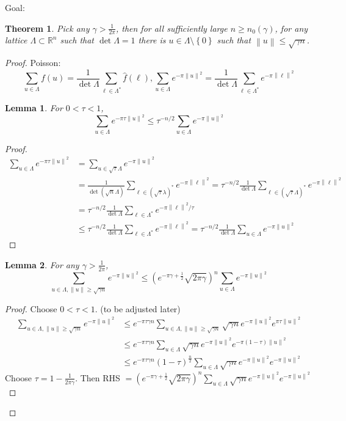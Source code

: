 \documentclass{report}
\newcommand{\R}{\mathbb{R}}
\newcommand{\norm}[1]{\left\| #1 \right\|}
\newcommand{\set}[1]{\left\{ #1 \right\}}
\newtheorem{theorem}{Theorem}[section]
\newtheorem{lemma}{Lemma}[section]
\theoremstyle{definition}
\theoremstyle{remark}
\numberwithin{equation}{section}
\begin{document}
Goal: 
\begin{theorem}
    Pick any $\gamma > \frac{1}{2\pi}$, then for all sufficiently large $n \geq n_0(\gamma)$, for any lattice $\Lambda \subset \R^n$ such that $\det \Lambda = 1$ there is $u \in \Lambda \setminus \set{0}$ such that $\norm{u} \leq \sqrt{\gamma n}$.
\end{theorem}
\begin{proof}
    Poisson:
    \[\sum_{u \in \Lambda} f(u) =\frac{1}{\det \Lambda} \sum_{\ell \in \Lambda^*} \widehat{f}(\ell), \sum_{u \in \Lambda} e^{-\pi\norm{u}^2} = \frac{1}{\det\Lambda}\sum_{\ell \in \Lambda^*} e^{-\pi\norm{\ell}^2}\]

    \begin{lemma}
        For $0 < \tau < 1$, \[\sum_{u \in \Lambda} e^{-\pi \tau \norm{u}^2} \leq \tau^{-n/2}\sum_{u \in \Lambda} e^{-\pi\norm{u}^2}\]
    \end{lemma}
    \begin{proof}
        \begin{align*}
            \sum_{u \in \Lambda}e^{-\pi\tau\norm{u}^2} & = \sum_{u \in \sqrt{\tau}\Lambda} e^{-\pi\norm{u}^2} \\
            & = \frac{1}{\det (\sqrt{n}\Lambda)}\sum_{\ell \in (\sqrt{\tau}\lambda)^*} e^{-\pi \norm{\ell}^2} = \tau^{-n/2}\frac{1}{\det\Lambda}\sum_{\ell \in (\sqrt{\tau}\Lambda)^*} e^{-\pi \norm{\ell}^2} \\
            & = \tau^{-n/2}\frac{1}{\det\Lambda}\sum_{\ell \in \Lambda^*} e^{-\pi \norm{\ell}^2/\tau} \\
            & \leq \tau^{-n/2}\frac{1}{\det\Lambda}\sum_{\ell \in \Lambda^*} e^{-\pi \norm{\ell}^2} = \tau^{-n/2}\frac{1}{\det\Lambda}\sum_{u \in \Lambda} e^{-\pi \norm{u}^2}
        \end{align*}
    \end{proof}

    \begin{lemma}
        For any $\gamma > \frac{1}{2\pi}$, \[\sum_{u \in \Lambda, \norm{u}\geq \sqrt{\gamma n}} e^{-\pi\norm{u}^2} \leq \left(e^{-\pi\gamma + \frac{1}{2}}\sqrt{2\pi\gamma}\right)^n \sum_{u \in \Lambda} e^{-\pi\norm{u}^2}\]
    \end{lemma}
    \begin{proof}
        Choose $0 < \tau < 1$. (to be adjusted later)
        \begin{align*}
            \sum_{u \in \Lambda, \norm{u}\geq\sqrt{\gamma n}} e^{-\pi\norm{u}^2} & 
            \leq e^{-\pi\tau\gamma n}\sum_{u \in \Lambda, \norm{u} \geq \sqrt{\gamma n}} \sqrt{\gamma n} e^{-\pi\norm{u}^2} e^{\pi\tau\norm{u}^2} \\
            & \leq e^{-\pi\tau\gamma n}\sum_{u \in \Lambda} \sqrt{\gamma n} e^{-\pi\norm{u}^2} e^{-\pi(1-\tau)\norm{u}^2} \\
            & \leq e^{-\pi\tau\gamma n}(1-\tau)^{\frac{n}{2}} \sum_{u \in \Lambda} \sqrt{\gamma n} e^{-\pi\norm{u}^2} e^{-\pi\norm{u}^2}
        \end{align*}
        Choose $\tau = 1 - \frac{1}{2\pi \gamma}$. Then RHS $= \left(e^{-\pi\gamma + \frac{1}{2}}\sqrt{2\pi\gamma}\right)^n \sum_{u \in \Lambda} \sqrt{\gamma n} e^{-\pi\norm{u}^2} e^{-\pi\norm{u}^2}$
    \end{proof}
    

\end{proof}
\end{document}
